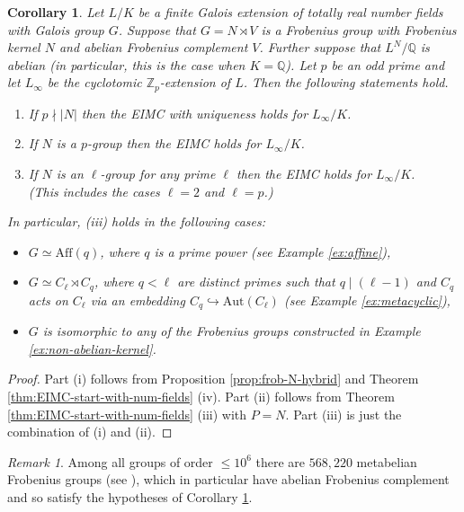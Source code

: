 \documentclass[12pt]{amsart}
\theoremstyle{plain}
\newtheorem{corollary}[theorem]{Corollary}
\theoremstyle{remark}
\newtheorem{remark}[theorem]{Remark}
\theoremstyle{definition}
\numberwithin{equation}{section}
\begin{document}
\begin{corollary}\label{cor:EIMC-Frobenius}
Let $L/K$ be a finite Galois extension of totally real number fields with Galois group $G$.
Suppose that $G = N \rtimes V$ is a Frobenius group with Frobenius kernel $N$ and abelian Frobenius complement $V$.
Further suppose that $L^{N}/{\mathbb{Q}}$ is abelian (in particular, this is the case when $K={\mathbb{Q}}$).
Let $p$ be an odd prime and let $L_{\infty}$ be the cyclotomic ${\mathbb{Z}}_{p}$-extension of $L$.
Then the following statements hold.
\begin{enumerate}
\item If $p \nmid |N|$ then the EIMC with uniqueness holds for $L_{\infty}/K$.
\item If $N$ is a $p$-group then the EIMC holds for $L_{\infty}/K$.
\item If $N$ is an $\ell$-group for any prime $\ell$ then the EIMC holds for $L_{\infty}/K$.\\
(This includes the cases $\ell=2$ and $\ell=p$.)
\end{enumerate}
In particular, (iii) holds in the following cases:
\begin{itemize}
\item $G \simeq {\mathrm{Aff}}(q)$, where $q$ is a prime power (see Example \ref{ex:affine}),
\item $G \simeq C_{\ell} \rtimes C_{q}$, where $q<\ell$ are distinct primes such that $q \mid (\ell-1)$ and $C_{q}$ acts on $C_{\ell}$ via an embedding $C_{q} \hookrightarrow {\mathrm{Aut}}(C_{\ell})$ (see Example \ref{ex:metacyclic}),
\item $G$ is isomorphic to any of the Frobenius groups constructed in Example \ref{ex:non-abelian-kernel}.
\end{itemize}
\end{corollary}

\begin{proof}
Part (i) follows from Proposition \ref{prop:frob-N-hybrid} and Theorem \ref{thm:EIMC-start-with-num-fields} (iv).
Part (ii) follows from  Theorem \ref{thm:EIMC-start-with-num-fields} (iii) with $P=N$.
Part (iii) is just the combination of (i) and (ii).
\end{proof}

\begin{remark}
Among all groups of order $\leq 10^{6}$ there are $568,220$ metabelian Frobenius groups
(see \cite[Remark 11.13 (A)]{MR1600514}), which in particular have abelian Frobenius complement
and so satisfy the hypotheses of Corollary \ref{cor:EIMC-Frobenius}.
\end{remark}
\end{document}
